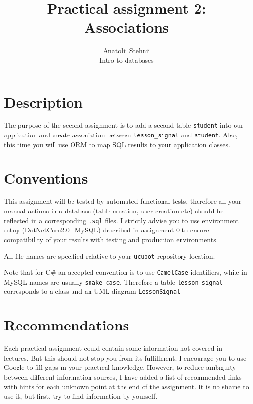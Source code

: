 \documentclass[12pt]{article}
\newcommand{\code}[1]{\texttt{#1}}
\begin{document}
\title{Practical assignment 2: Associations}
\author{Anatolii Stehnii\\Intro to databases}
\maketitle

\section*{Description}

The purpose of the second assignment  is to add a second table \code{student} into our application and create association between \code{lesson\_signal} and \code{student}. Also, this time you will use ORM to map SQL results to your application classes.

\section*{Conventions}

This assignment will be tested by automated functional tests, therefore all your manual actions in a database (table creation, user creation etc) should be reflected in a corresponding \code{.sql} files. I strictly advise you to use environment setup (DotNetCore2.0+MySQL) described in assignment 0 to ensure compatibility of your results with testing and production environments.

All file names are specified relative to your \code{ucubot} repository location.

Note that for C\# an accepted convention is to use \code{CamelCase} identifiers, while in MySQL names are usually \code{snake\_case}. Therefore a table \code{lesson\_signal} corresponds to a class and an UML diagram \code{LessonSignal}.

\section*{Recommendations}

Each practical assignment could contain some information not covered in lectures. But this should not stop you from its fulfillment. I encourage you to use Google to fill gaps in your practical knowledge. However, to reduce ambiguity between different information sources, I have added a list of recommended links with hints for each unknown point at the end of the assignment. It is no shame to use it, but first, try to find information by yourself.
\end{document}

